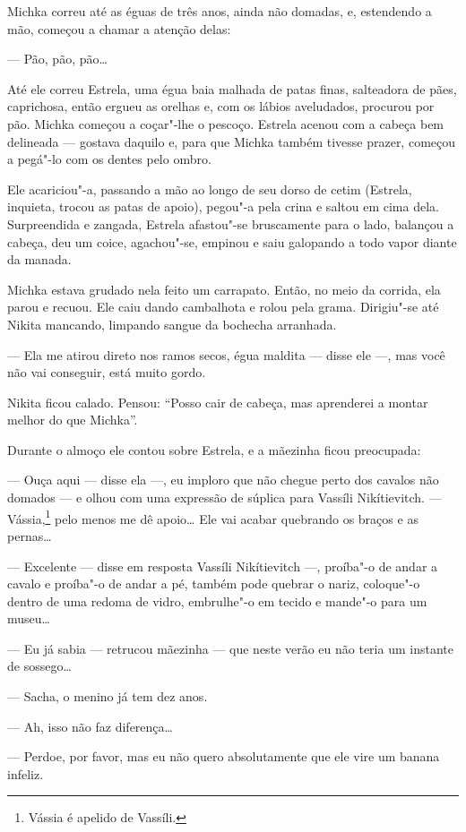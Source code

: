 Michka correu até as éguas de três anos, ainda não domadas, e,
estendendo a mão, começou a chamar a atenção delas:

--- Pão, pão, pão\ldots{}

Até ele correu Estrela, uma égua baia malhada de patas finas, salteadora
de pães, caprichosa, então ergueu as orelhas e, com os lábios
aveludados, procurou por pão. Michka começou a coçar"-lhe o pescoço.
Estrela acenou com a cabeça bem delineada --- gostava daquilo e, para
que Michka também tivesse prazer, começou a pegá"-lo com os dentes pelo
ombro.

Ele acariciou"-a, passando a mão ao longo de seu dorso de cetim (Estrela,
inquieta, trocou as patas de apoio), pegou"-a pela crina e saltou em cima
dela. Surpreendida e zangada, Estrela afastou"-se bruscamente para o
lado, balançou a cabeça, deu um coice, agachou"-se, empinou e saiu
galopando a todo vapor diante da manada.

Michka estava grudado nela feito um carrapato. Então, no meio da
corrida, ela parou e recuou. Ele caiu dando cambalhota e rolou pela
grama. Dirigiu"-se até Nikita mancando, limpando sangue da bochecha
arranhada.

--- Ela me atirou direto nos ramos secos, égua maldita --- disse ele
---, mas você não vai conseguir, está muito gordo.

Nikita ficou calado. Pensou: ``Posso cair de cabeça, mas aprenderei a
montar melhor do que Michka''.

Durante o almoço ele contou sobre Estrela, e a mãezinha ficou
preocupada:

--- Ouça aqui --- disse ela ---, eu imploro que não chegue perto dos
cavalos não domados --- e olhou com uma expressão de súplica para
Vassíli Nikítievitch. --- Vássia,\footnote{Vássia é apelido de Vassíli.}
pelo menos me dê apoio\ldots{} Ele vai acabar quebrando os braços e as
pernas\ldots{}

--- Excelente --- disse em resposta Vassíli Nikítievitch ---, proíba"-o
de andar a cavalo e proíba"-o de andar a pé, também pode quebrar o nariz,
coloque"-o dentro de uma redoma de vidro, embrulhe"-o em tecido e mande"-o
para um museu\ldots{}

--- Eu já sabia --- retrucou mãezinha --- que neste verão eu não teria
um instante de sossego\ldots{}

--- Sacha, o menino já tem dez anos.

--- Ah, isso não faz diferença\ldots{}

--- Perdoe, por favor, mas eu não quero absolutamente que ele vire um
banana infeliz.


